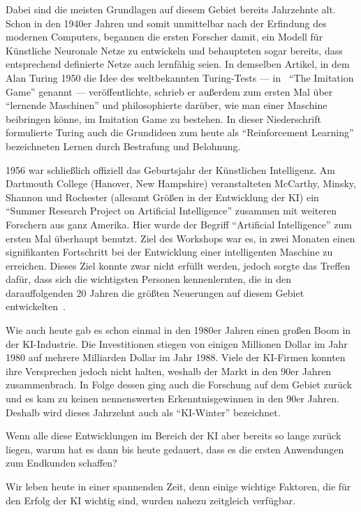 Dabei sind die meisten Grundlagen auf diesem Gebiet bereits Jahrzehnte alt. Schon in den 1940er Jahren und somit unmittelbar nach der Erfindung des modernen Computers, begannen die ersten Forscher damit, ein Modell für Künstliche Neuronale Netze zu entwickeln und behaupteten sogar bereits, dass entsprechend definierte Netze auch lernfähig seien. In demselben Artikel, in dem Alan Turing 1950 die Idee des weltbekannten Turing-Tests --- in~\cite{TURING.1950} "`The Imitation Game"' genannt --- veröffentlichte, schrieb er außerdem zum ersten Mal über "`lernende Maschinen"' und philosophierte darüber, wie man einer Maschine beibringen könne, im Imitation Game zu bestehen. In dieser Niederschrift formulierte Turing auch die Grundideen zum heute als "`Reinforcement Learning"' bezeichneten Lernen durch Bestrafung und Belohnung.

1956 war schließlich offiziell das Geburtsjahr der Künstlichen Intelligenz. Am Dartmouth College (Hanover, New Hampshire) veranstalteten McCarthy, Minsky, Shannon und Rochester (allesamt Größen in der Entwicklung der \gls{KI}) ein "`Summer Research Project on Artificial Intelligence"' zusammen mit weiteren Forschern aus ganz Amerika. Hier wurde der Begriff "`Artificial Intelligence"' zum ersten Mal überhaupt benutzt. Ziel des Workshops war es, in zwei Monaten einen signifikanten Fortschritt bei der Entwicklung einer intelligenten Maschine zu erreichen. Dieses Ziel konnte zwar nicht erfüllt werden, jedoch sorgte das Treffen dafür, dass sich die wichtigsten Personen kennenlernten, die in den darauffolgenden 20 Jahren die größten Neuerungen auf diesem Gebiet entwickelten~\cite{Russell.2012}.

Wie auch heute gab es schon einmal in den 1980er Jahren einen großen Boom in der KI-Industrie. Die Investitionen stiegen von einigen Millionen Dollar im Jahr 1980 auf mehrere Milliarden Dollar im Jahr 1988. Viele der \gls{KI}-Firmen konnten ihre Versprechen jedoch nicht halten, weshalb der Markt in den 90er Jahren zusammenbrach. In Folge dessen ging auch die Forschung auf dem Gebiet zurück und es kam zu keinen nennenswerten Erkenntnisgewinnen in den 90er Jahren. Deshalb wird dieses Jahrzehnt auch als "`\gls{KI}-Winter"' bezeichnet.

Wenn alle diese Entwicklungen im Bereich der \gls{KI} aber bereits so lange zurück liegen, warum hat es dann bis heute gedauert, dass es die ersten Anwendungen zum Endkunden schaffen?

Wir leben heute in einer spannenden Zeit, denn einige wichtige Faktoren, die für den Erfolg der \gls{KI} wichtig sind, wurden nahezu zeitgleich verfügbar.

